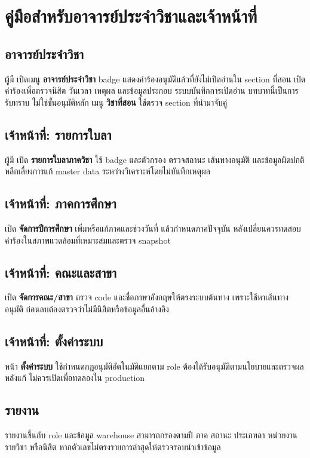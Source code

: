 \section{คู่มือสำหรับอาจารย์ประจำวิชาและเจ้าหน้าที่}
\subsection{อาจารย์ประจำวิชา}
ผู้มี  เปิดเมนู \textbf{อาจารย์ประจำวิชา} badge แสดงคำร้องอนุมัติแล้วที่ยังไม่เปิดอ่านใน section ที่สอน เปิดคำร้องเพื่อตรวจนิสิต วันเวลา เหตุผล และข้อมูลประกอบ ระบบบันทึกการเปิดอ่าน บทบาทนี้เป็นการรับทราบ ไม่ใช่ขั้นอนุมัติหลัก เมนู \textbf{วิชาที่สอน} ใช้ตรวจ section ที่นำมาจับคู่

\subsection{เจ้าหน้าที่: รายการใบลา}
ผู้มี  เปิด \textbf{รายการใบลาภาควิชา} ใช้ badge และตัวกรอง ตรวจสถานะ เส้นทางอนุมัติ และข้อมูลผิดปกติ หลีกเลี่ยงการแก้ master data ระหว่างวิเคราะห์โดยไม่บันทึกเหตุผล

\subsection{เจ้าหน้าที่: ภาคการศึกษา}
เปิด \textbf{จัดการปีการศึกษา} เพิ่มหรือแก้ภาคและช่วงวันที่ แล้วกำหนดภาคปัจจุบัน หลังเปลี่ยนควรทดสอบคำร้องในสภาพแวดล้อมที่เหมาะสมและตรวจ snapshot

\subsection{เจ้าหน้าที่: คณะและสาขา}
เปิด \textbf{จัดการคณะ/สาขา} ตรวจ code และชื่อภาษาอังกฤษให้ตรงระบบต้นทาง เพราะใช้หาเส้นทางอนุมัติ ก่อนลบต้องตรวจว่าไม่มีนิสิตหรือข้อมูลอื่นอ้างอิง

\subsection{เจ้าหน้าที่: ตั้งค่าระบบ}
หน้า \textbf{ตั้งค่าระบบ} ใช้กำหนดกฎอนุมัติอัตโนมัติแยกตาม role ต้องได้รับอนุมัติตามนโยบายและตรวจผลหลังแก้ ไม่ควรเปิดเพื่อทดลองใน production

\subsection{รายงาน}
รายงานขึ้นกับ role และข้อมูล warehouse สามารถกรองตามปี ภาค สถานะ ประเภทลา หน่วยงาน รายวิชา หรือนิสิต หากตัวเลขไม่ตรงรายการล่าสุดให้ตรวจรอบนำเข้าข้อมูล
